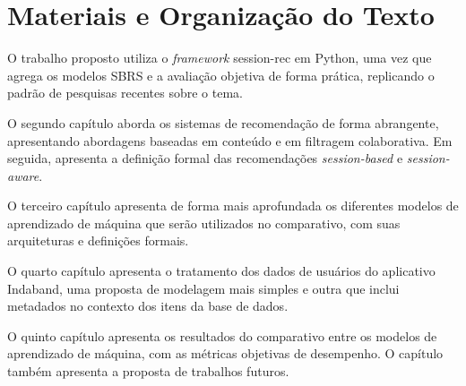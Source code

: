 \section{Materiais e Organização do Texto}

O trabalho proposto utiliza o \textit{framework} session-rec \cite{sessionrec}
em Python, uma vez que agrega os modelos SBRS e a avaliação objetiva de forma
prática, replicando o padrão de pesquisas recentes sobre o tema. 

O segundo capítulo aborda os sistemas de recomendação de forma abrangente,
apresentando abordagens baseadas em conteúdo e em filtragem
colaborativa. Em seguida, apresenta a definição formal das recomendações
\textit{session-based} e \textit{session-aware}.

O terceiro capítulo apresenta de forma mais aprofundada os diferentes modelos de
aprendizado de máquina que serão utilizados no comparativo, com suas
arquiteturas e definições formais.

O quarto capítulo apresenta o tratamento dos dados de usuários do aplicativo
Indaband, uma proposta de modelagem mais simples e outra que inclui metadados no
contexto dos itens da base de dados.

O quinto capítulo apresenta os resultados do comparativo entre os modelos de
aprendizado de máquina, com as métricas objetivas de desempenho. O capítulo
também apresenta a proposta de trabalhos futuros.